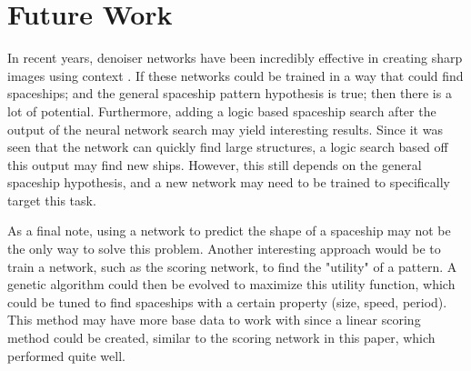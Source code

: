 \documentclass{l4proj}
\begin{document}
\section{Future Work}

In recent years, denoiser networks have been incredibly effective in creating sharp images using context \citep{Zamir_2022_CVPR}. If these networks could be trained in a way that could find spaceships; and the general spaceship pattern hypothesis is true; then there is a lot of potential. Furthermore, adding a logic based spaceship search after the output of the neural network search may yield interesting results. Since it was seen that the network can quickly find large structures, a logic search based off this output may find new ships. However, this still depends on the general spaceship hypothesis, and a new network may need to be trained to specifically target this task.

As a final note, using a network to predict the shape of a spaceship may not be the only way to solve this problem. Another interesting approach would be to train a network, such as the scoring network, to find the "utility" of a pattern. A genetic algorithm could then be evolved to maximize this utility function, which could be tuned to find spaceships with a certain property (size, speed, period). This method may have more base data to work with since a linear scoring method could be created, similar to the scoring network in this paper, which performed quite well. 






\end{document}
